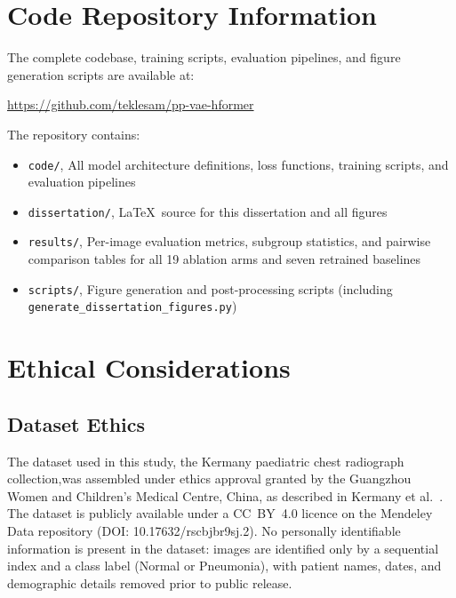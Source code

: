\documentclass[12pt, a4paper, twoside, openright]{book}
\begin{document}
\begin{appendices}
\chapter{Code Repository Information}
\label{app:code}


The complete codebase, training scripts, evaluation pipelines, and figure generation scripts are available at:

\begin{center}
\url{https://github.com/teklesam/pp-vae-hformer}
\end{center}

\noindent The repository contains:
\begin{itemize}
  \item \texttt{code/}, All model architecture definitions, loss functions, training scripts, and evaluation pipelines
  \item \texttt{dissertation/}, \LaTeX\ source for this dissertation and all figures
  \item \texttt{results/}, Per-image evaluation metrics, subgroup statistics, and pairwise comparison tables for all 19 ablation arms and seven retrained baselines
  \item \texttt{scripts/}, Figure generation and post-processing scripts (including \texttt{generate\_dissertation\_figures.py})
\end{itemize}

\chapter{Ethical Considerations}
\label{app:ethics}

\section{Dataset Ethics}
\label{app:ethics:dataset}

The dataset used in this study, the Kermany paediatric chest radiograph collection,was assembled under ethics approval granted by the Guangzhou Women and Children's Medical Centre, China, as described in Kermany et al.\ \cite{kermany_identifying_2018}. The dataset is publicly available under a CC~BY~4.0 licence on the Mendeley Data repository (DOI: 10.17632/rscbjbr9sj.2). No personally identifiable information is present in the dataset: images are identified only by a sequential index and a class label (Normal or Pneumonia), with patient names, dates, and demographic details removed prior to public release.


\end{appendices}
\end{document}
